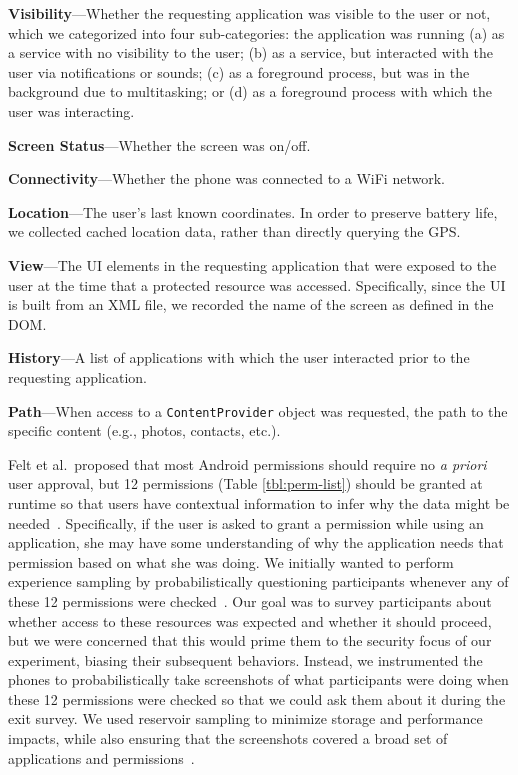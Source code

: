 \documentclass[letterpaper,twocolumn,10pt]{article}
\newenvironment{packed_item}{
\begin{itemize}
  \setlength{\itemsep}{1pt}
  \setlength{\parskip}{0pt}
  \setlength{\parsep}{0pt}
}{\end{itemize}}
\begin{document}
\begin{packed_item}
\item {\bf Visibility}---Whether the requesting application was visible to the user or not, which we categorized into four sub-categories: the application was running (a) as a service with no visibility to the user; (b) as a service, but interacted with the user via notifications or sounds; (c) as a foreground process, but was in the background due to multitasking; or (d) as a foreground process with which the user was interacting.
\item {\bf Screen Status}---Whether the screen was on/off.
\item {\bf Connectivity}---Whether the phone was connected to a WiFi network.
\item {\bf Location}---The user's last known coordinates. In order to preserve battery life, we collected cached location data, rather than directly querying the GPS.
\item {\bf View}---The UI elements in the requesting application that were exposed to the user at the time that a protected resource was accessed. Specifically, since the UI is built from an XML file, we recorded the name of the screen as defined in the DOM.
\item {\bf History}---A list of applications with which the user interacted prior to the requesting application.
\item {\bf Path}---When access to a {\tt ContentProvider} object was requested, the path to the specific content (e.g., photos, contacts, etc.).
\end{packed_item}




Felt et al.\ proposed that most Android permissions should require no {\it a priori} user approval, but 12 permissions (Table \ref{tbl:perm-list}) should be granted at runtime so that users have contextual information to infer why the data might be needed~\cite{Felt2012b}. Specifically, if the user is asked to grant a permission while using an application, she may have some understanding of why the application needs that permission based on what she was doing. We initially wanted to perform experience sampling by probabilistically questioning participants whenever any of these 12 permissions were checked~\cite{Larson1983}. Our goal was to survey participants about whether access to these resources was expected and whether it should proceed, but we were concerned that this would prime them to the security focus of our experiment, biasing their subsequent behaviors. Instead, we instrumented the phones to probabilistically take screenshots of what participants were doing when these 12 permissions were checked so that we could ask them about it during the exit survey. We used reservoir sampling to minimize storage and performance impacts, while also ensuring that the screenshots covered a broad set of applications and permissions~\cite{Vitter1985}.
\end{document}
